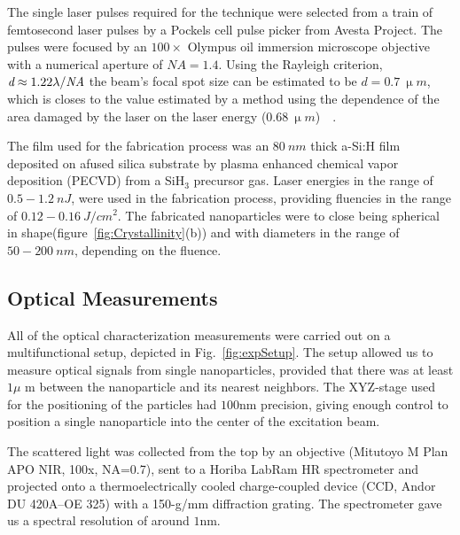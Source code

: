                The single laser pulses required for the technique were selected from a train of femtosecond laser pulses by a Pockels cell
            pulse picker from Avesta Project. The pulses were focused by an $100\times$ Olympus oil immersion microscope objective with a
            numerical aperture of $\mathit{NA}=1.4$. Using the Rayleigh criterion, $\emph{d}\approx 1.22\lambda/\mathit{NA}$ the beam's focal
            spot size can be estimated to be $d=0.7~\si{\upmu m}$, which is closes to the value estimated by a method using the dependence
            of the area damaged by the laser on the laser energy ($0.68~\si{\upmu m}$)~~\cite{liu1982simple}.

                The film used for the fabrication process was an $80~\si{nm}$ thick a-Si:H film deposited on afused silica substrate by
            plasma enhanced chemical vapor deposition (PECVD) from a SiH$_{3}$ precursor gas. Laser energies in the range of $0.5-1.2~\si{nJ}$, were used in the fabrication process, providing fluencies in
            the range of $0.12-0.16~\si{J/cm^{2}}$. The fabricated nanoparticles were to close being spherical in shape(figure~\ref{fig:Crystallinity}(b))
            and with diameters in the range of $50-200~\si{nm}$, depending on the fluence.

    \clearpage
    \subsection{Optical Measurements}
            All of the optical characterization measurements were carried out on a multifunctional setup, depicted in
            Fig.~\ref{fig:expSetup}. The setup allowed us to measure optical signals from single nanoparticles, provided that
            there was at least $1\mu$ m between the nanoparticle and its nearest neighbors. The XYZ-stage used for the
            positioning of the particles had $100$nm precision, giving enough control to position a single nanoparticle into
            the center of the excitation beam.

            The scattered light was collected from the top by an objective (Mitutoyo M Plan APO NIR, 100x, NA=0.7),
            sent to a Horiba LabRam HR spectrometer and projected onto a thermoelectrically cooled charge-coupled device
            (CCD, Andor DU 420A--OE 325) with a 150-g/mm diffraction grating. The spectrometer gave us a spectral resolution
            of around $1$nm.

